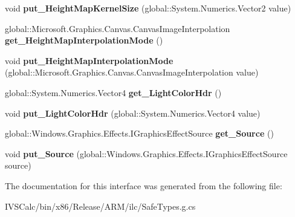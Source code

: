 \begin{DoxyCompactItemize}
\item 
\mbox{\label{interface_microsoft_1_1_graphics_1_1_canvas_1_1_effects_1_1_i_distant_diffuse_effect_abc8594df44f1362ba522d33dbd36499e}} 
void {\bfseries put\+\_\+\+Height\+Map\+Kernel\+Size} (global\+::\+System.\+Numerics.\+Vector2 value)
\item 
\mbox{\label{interface_microsoft_1_1_graphics_1_1_canvas_1_1_effects_1_1_i_distant_diffuse_effect_ac8e0128a18354fb47712359d4091e8f7}} 
global\+::\+Microsoft.\+Graphics.\+Canvas.\+Canvas\+Image\+Interpolation {\bfseries get\+\_\+\+Height\+Map\+Interpolation\+Mode} ()
\item 
\mbox{\label{interface_microsoft_1_1_graphics_1_1_canvas_1_1_effects_1_1_i_distant_diffuse_effect_a6b663d3dc616764c53b170b9a03fbe9b}} 
void {\bfseries put\+\_\+\+Height\+Map\+Interpolation\+Mode} (global\+::\+Microsoft.\+Graphics.\+Canvas.\+Canvas\+Image\+Interpolation value)
\item 
\mbox{\label{interface_microsoft_1_1_graphics_1_1_canvas_1_1_effects_1_1_i_distant_diffuse_effect_a4ff1476fd89108a86f537334b15dcb06}} 
global\+::\+System.\+Numerics.\+Vector4 {\bfseries get\+\_\+\+Light\+Color\+Hdr} ()
\item 
\mbox{\label{interface_microsoft_1_1_graphics_1_1_canvas_1_1_effects_1_1_i_distant_diffuse_effect_a309009a35f74367a5df709977daacc4a}} 
void {\bfseries put\+\_\+\+Light\+Color\+Hdr} (global\+::\+System.\+Numerics.\+Vector4 value)
\item 
\mbox{\label{interface_microsoft_1_1_graphics_1_1_canvas_1_1_effects_1_1_i_distant_diffuse_effect_aecf1fa03d3dd124a0187bf585c4a6bff}} 
global\+::\+Windows.\+Graphics.\+Effects.\+I\+Graphics\+Effect\+Source {\bfseries get\+\_\+\+Source} ()
\item 
\mbox{\label{interface_microsoft_1_1_graphics_1_1_canvas_1_1_effects_1_1_i_distant_diffuse_effect_a1a3fd740e95528560a70b71705e67189}} 
void {\bfseries put\+\_\+\+Source} (global\+::\+Windows.\+Graphics.\+Effects.\+I\+Graphics\+Effect\+Source source)
\end{DoxyCompactItemize}


The documentation for this interface was generated from the following file\+:\begin{DoxyCompactItemize}
\item 
I\+V\+S\+Calc/bin/x86/\+Release/\+A\+R\+M/ilc/Safe\+Types.\+g.\+cs\end{DoxyCompactItemize}

